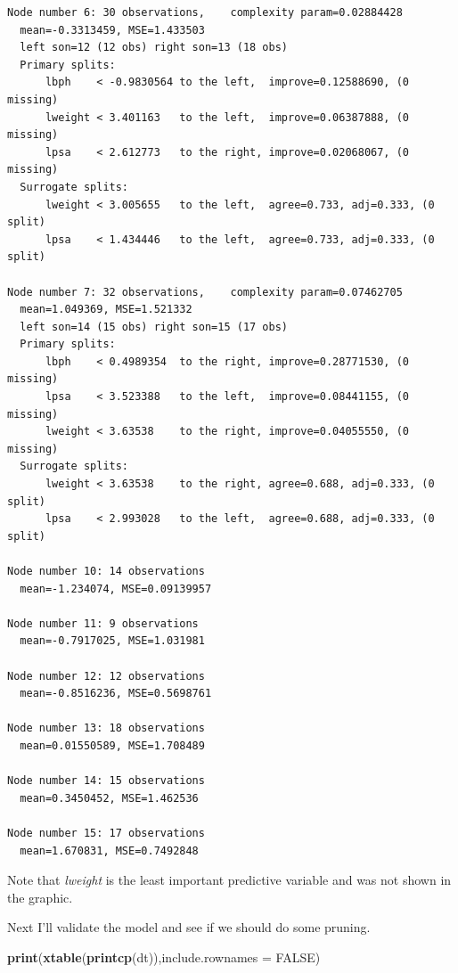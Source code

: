 \documentclass[]{article}
\newenvironment{Shaded}{\begin{snugshade}}{\end{snugshade}}
\newcommand{\KeywordTok}[1]{\textcolor[rgb]{0.13,0.29,0.53}{\textbf{#1}}}
\newcommand{\DataTypeTok}[1]{\textcolor[rgb]{0.13,0.29,0.53}{#1}}
\newcommand{\OtherTok}[1]{\textcolor[rgb]{0.56,0.35,0.01}{#1}}
\newcommand{\NormalTok}[1]{#1}
\renewcommand{\&}{and}
\begin{document}
\begin{shaded}
\begin{verbatim}
Node number 6: 30 observations,    complexity param=0.02884428
  mean=-0.3313459, MSE=1.433503 
  left son=12 (12 obs) right son=13 (18 obs)
  Primary splits:
      lbph    < -0.9830564 to the left,  improve=0.12588690, (0 missing)
      lweight < 3.401163   to the left,  improve=0.06387888, (0 missing)
      lpsa    < 2.612773   to the right, improve=0.02068067, (0 missing)
  Surrogate splits:
      lweight < 3.005655   to the left,  agree=0.733, adj=0.333, (0 split)
      lpsa    < 1.434446   to the left,  agree=0.733, adj=0.333, (0 split)

Node number 7: 32 observations,    complexity param=0.07462705
  mean=1.049369, MSE=1.521332 
  left son=14 (15 obs) right son=15 (17 obs)
  Primary splits:
      lbph    < 0.4989354  to the right, improve=0.28771530, (0 missing)
      lpsa    < 3.523388   to the left,  improve=0.08441155, (0 missing)
      lweight < 3.63538    to the right, improve=0.04055550, (0 missing)
  Surrogate splits:
      lweight < 3.63538    to the right, agree=0.688, adj=0.333, (0 split)
      lpsa    < 2.993028   to the left,  agree=0.688, adj=0.333, (0 split)

Node number 10: 14 observations
  mean=-1.234074, MSE=0.09139957 

Node number 11: 9 observations
  mean=-0.7917025, MSE=1.031981 

Node number 12: 12 observations
  mean=-0.8516236, MSE=0.5698761 

Node number 13: 18 observations
  mean=0.01550589, MSE=1.708489 

Node number 14: 15 observations
  mean=0.3450452, MSE=1.462536 

Node number 15: 17 observations
  mean=1.670831, MSE=0.7492848 
\end{verbatim}
\end{shaded}

Note that \emph{lweight} is the least important predictive variable and
was not shown in the graphic.

Next I'll validate the model and see if we should do some pruning.

\begin{Shaded}
\begin{Highlighting}[]
\KeywordTok{print}\NormalTok{(}\KeywordTok{xtable}\NormalTok{(}\KeywordTok{printcp}\NormalTok{(dt)),}\DataTypeTok{include.rownames =} \OtherTok{FALSE}\NormalTok{)}
\end{Highlighting}
\end{Shaded}
\end{document}
